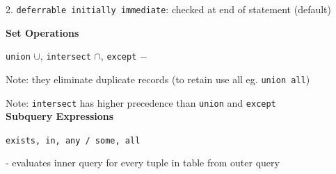 \documentclass[10pt, a4paper]{article}
\newcommand{\red}[1]{{\color{red}#1}}
\newcommand{\tab}[0]{\hspace*{2mm}}
\begin{document}
\begin{multicols*}{3}
		2. \texttt{deferrable initially immediate}: checked at end of statement (default)





		





		\textbf{Set Operations}

		\texttt{union} $\cup$, \texttt{intersect} $\cap$, \texttt{except} $-$

		\red{Note}: they eliminate duplicate records (to retain use all eg. \texttt{union all})

		\red{Note}: \texttt{intersect} has higher precedence than \texttt{union} and \texttt{except}\\

		\textbf{Subquery Expressions}

		\texttt{exists, in, any / some, all}

		- evaluates inner query for every tuple in table from outer query









\end{multicols*}
\end{document}
